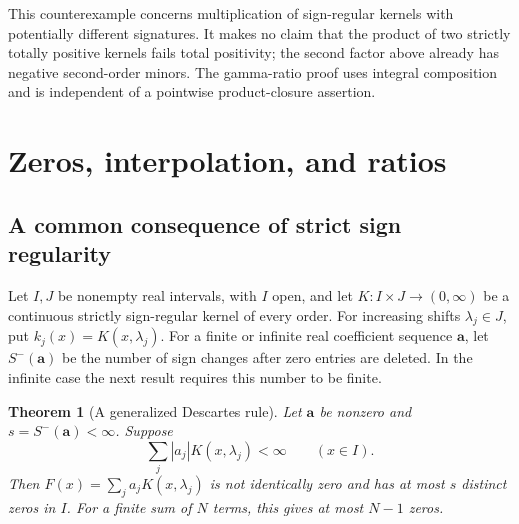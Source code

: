 \documentclass[11pt,a4paper]{article}
\newtheorem{theorem}{Theorem}[section]
\theoremstyle{definition}
\theoremstyle{remark}
\begin{document}
This counterexample concerns multiplication of sign-regular kernels
with potentially different signatures. It makes no claim that the
product of two strictly totally positive kernels fails total
positivity; the second factor above already has negative second-order
minors. The gamma-ratio proof uses integral composition and is independent
of a pointwise product-closure assertion.

\section{Zeros, interpolation, and ratios}\label{app:section}

\subsection{A common consequence of strict sign regularity}

Let \(I,J\) be nonempty real intervals, with \(I\) open, and let
\(K:I\times J\to(0,\infty)\) be a continuous strictly sign-regular
kernel of every order. For increasing shifts \(\lambda_j\in J\), put
\(k_j(x)=K(x,\lambda_j)\). For a finite or infinite real coefficient
sequence \(\mathbf a\), let \(S^-(\mathbf a)\) be the number of sign
changes after zero entries are deleted. In the infinite case the next
result requires this number to be finite.

\begin{theorem}[A generalized Descartes rule]\label{cor:zeros}
Let \(\mathbf a\) be nonzero and \(s=S^-(\mathbf a)<\infty\).
Suppose
\begin{equation}\label{app:abs-convergence}
 \sum_j |a_j|K(x,\lambda_j)<\infty\qquad(x\in I).
\end{equation}
Then \(F(x)=\sum_j a_jK(x,\lambda_j)\) is not identically zero and
has at most \(s\) distinct zeros in \(I\).
For a finite sum of \(N\) terms, this gives at most \(N-1\) zeros.
\end{theorem}
\end{document}
